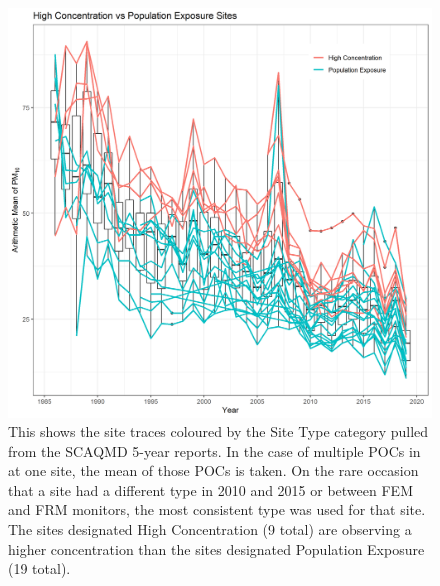 \documentclass{article}
\begin{document}
\begin{figure}[ht]
	\centering
	\includegraphics[width = \textwidth]{Figures/SOCAB_metadata_Site_Type.png}
	\caption{This shows the site traces coloured by the Site Type category pulled from the \ac{SCAQMD} 5-year reports.  In the case of multiple \ac{POC}s in at one site, the mean of those \ac{POC}s is taken.  On the rare occasion that a site had a different type in 2010 and 2015 or between \ac{FEM} and \ac{FRM} monitors, the most consistent type was used for that site.  The sites designated High Concentration (9 total) are observing a higher concentration than the sites designated Population Exposure (19 total).  }
	\label{fig:SOCAB_metadata_Site_Type}
\end{figure}
\end{document}
